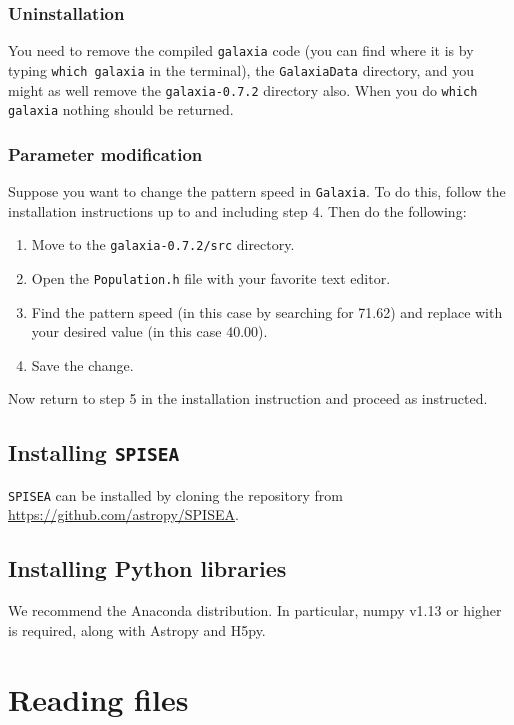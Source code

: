 \documentclass{scrartcl}
\begin{document}
\subsubsection{Uninstallation}

You need to remove the compiled \texttt{galaxia} code (you can find where it is by typing \texttt{which galaxia} in the terminal), the \texttt{GalaxiaData} directory, and you might as well remove the \texttt{galaxia-0.7.2} directory also.
When you do \texttt{which galaxia} nothing should be returned.

\subsubsection{Parameter modification}

Suppose you want to change the pattern speed in \texttt{Galaxia}.
To do this, follow the installation instructions up to and including step 4.
Then do the following:
\begin{enumerate}
    \item Move to the \texttt{galaxia-0.7.2/src} directory.
    \item Open the \texttt{Population.h} file with your favorite text editor.
    \item Find the pattern speed (in this case by searching for 71.62) and replace with your desired value (in this case 40.00).
    \item Save the change.
\end{enumerate}
Now return to step 5 in the installation instruction and proceed as instructed.

\subsection{Installing \texttt{SPISEA}}

\texttt{SPISEA} can be installed by cloning the repository from \url{https://github.com/astropy/SPISEA}.

\subsection{Installing Python libraries}

We recommend the Anaconda distribution.
In particular, numpy v1.13 or higher is required, along with Astropy and H5py.

\newpage

\section{Reading files}
\end{document}
